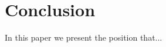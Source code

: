 \section{Conclusion}
\label{section:conclusion}
\normalsize


In this paper we present the position that...